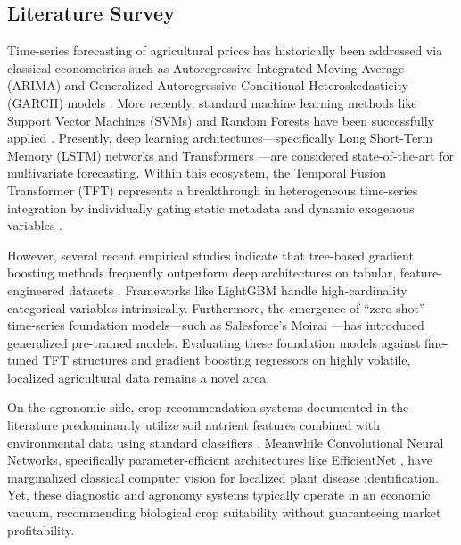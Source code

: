 \documentclass[conference]{IEEEtran}
\begin{document}
\subsection{Literature Survey}
Time-series forecasting of agricultural prices has historically been addressed via classical econometrics such as Autoregressive Integrated Moving Average (ARIMA) and Generalized Autoregressive Conditional Heteroskedasticity (GARCH) models \cite{box2015, bollerslev1986}. More recently, standard machine learning methods like Support Vector Machines (SVMs) and Random Forests have been successfully applied \cite{breiman2001, chen2016xgboost}. 
Presently, deep learning architectures—specifically Long Short-Term Memory (LSTM) networks \cite{hochreiter1997} and Transformers \cite{vaswani2017}—are considered state-of-the-art for multivariate forecasting. Within this ecosystem, the Temporal Fusion Transformer (TFT) represents a breakthrough in heterogeneous time-series integration by individually gating static metadata and dynamic exogenous variables \cite{lim2021tft}.

However, several recent empirical studies indicate that tree-based gradient boosting methods frequently outperform deep architectures on tabular, feature-engineered datasets \cite{grinsztajn2022tree}. Frameworks like LightGBM \cite{ke2017lightgbm} handle high-cardinality categorical variables intrinsically. Furthermore, the emergence of ``zero-shot'' time-series foundation models—such as Salesforce's Moirai \cite{woo2024moirai}—has introduced generalized pre-trained models. Evaluating these foundation models against fine-tuned TFT structures and gradient boosting regressors on highly volatile, localized agricultural data remains a novel area.

On the agronomic side, crop recommendation systems documented in the literature predominantly utilize soil nutrient features combined with environmental data using standard classifiers \cite{pudumalar2017}. Meanwhile Convolutional Neural Networks, specifically parameter-efficient architectures like EfficientNet \cite{tan2019efficientnet}, have marginalized classical computer vision for localized plant disease identification. Yet, these diagnostic and agronomy systems typically operate in an economic vacuum, recommending biological crop suitability without guaranteeing market profitability.
\end{document}
